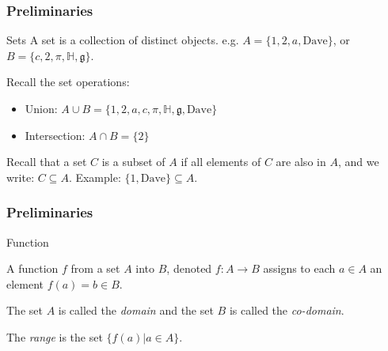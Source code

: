 \documentclass{beamer}
\begin{document}
\begin{frame}
  \frametitle{Preliminaries}
  \begin{block}{Sets}
    A set is a collection of distinct objects. e.g. $A = \{1,2,a,\mbox{Dave}\}$, or $B = \{c, 2, \pi, \mathbb{H}, \mathfrak{g}\}$.
  \end{block}
  Recall the set operations:
  \begin{itemize}
    \item Union: $A \cup B = \{1,2,a,c,\pi,\mathbb{H},\mathfrak{g},\mbox{Dave}\}$
    \item Intersection: $A \cap B = \{2\}$
  \end{itemize}
  Recall that a set $C$ is a subset of $A$ if all elements of $C$ are also in $A$, and we write: $C \subseteq A$. Example: $\{1,\mbox{Dave}\}\subseteq A$.
\end{frame}
\begin{frame}
  \frametitle{Preliminaries}
  \begin{block}{Function}

    A function $f$ from a set $A$ into $B$, denoted $f: A \rightarrow B$ assigns to each $a \in A$ an element $f(a) = b \in B$.

    The set $A$ is called the \emph{domain} and the set $B$ is called the \emph{co-domain}.

    The \emph{range} is the set $\{ f(a) | a \in A \}$.
  \end{block}
  \begin{example}
    \begin{center}
  \end{center}
  \end{example}
\end{frame}
\end{document}
